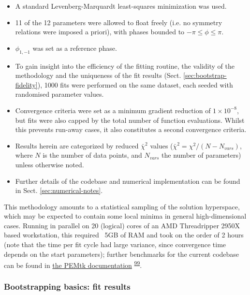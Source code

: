\documentclass[10pt]{article}
\begin{document}
\begin{itemize}
\item A standard Levenberg-Marquardt least-squares minimization was used.
\item 11 of the 12 parameters were allowed to float freely (i.e. no symmetry relations were imposed a priori), with phases bounded to $-\pi\leq\phi\leq\pi$. %
\item $\phi_{1,-1}$ was set as a reference phase. 
\item To gain insight into the efficiency of the fitting routine, the validity of the methodology and the uniqueness of the fit results (Sect. \ref{sec:bootstrap-fidelity}), 1000 fits were performed on the same dataset, each seeded with randomised parameter values. 
\item Convergence criteria were set as a minimum gradient reduction of $1\times10^{-8}$, %
but fits were also capped by the total number of function evaluations. Whilst this prevents run-away cases, it also constitutes a second convergence criteria.
\item Results herein are categorized by reduced $\bar{\chi}^2$ values ($\bar{\chi}^2=\chi^2/(N-N_{vars})$, where $N$ is the number of data points, and $N_{vars}$ the number of parameters) unless otherwise noted.
\item Further details of the codebase and numerical implementation can be found in Sect. \ref{sec:numerical-notes}.
\end{itemize}

This methodology amounts to a statistical sampling of the solution hyperspace, which may be expected to contain some local minima in general high-dimensional cases.  Running in parallel on 20 (logical) cores of an AMD Threadripper 2950X based workstation, this required ~5GB of RAM and took on the order of 2 hours (note that the time per fit cycle had large variance, since convergence time depends on the start parameters); further benchmarks for the current codebase can be found in \href{https://pemtk.readthedocs.io/en/latest/index.html}{the PEMtk documentation} \textsuperscript{\hyperref[csl:99]{99}}.


\subsubsection{Bootstrapping basics: fit results}
\end{document}
